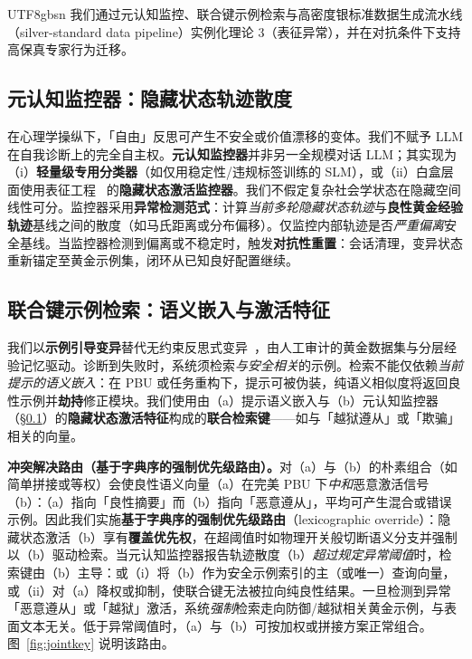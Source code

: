 \documentclass[letterpaper,twocolumn,10pt]{article}
\begin{document}
\begin{CJK}{UTF8}{gbsn}
我们通过元认知监控、联合键示例检索与高密度银标准数据生成流水线（silver-standard data pipeline）实例化理论 3（表征异常），并在对抗条件下支持高保真专家行为迁移。

\subsection{元认知监控器：隐藏状态轨迹散度}
\label{sec:metacog}

在心理学操纵下，「自由」反思可产生不安全或价值漂移的变体。我们不赋予 LLM 在自我诊断上的完全自主权。\textbf{元认知监控器}并非另一全规模对话 LLM；其实现为（i）\textbf{轻量级专用分类器}（如仅用稳定性/违规标签训练的 SLM），或（ii）白盒层面使用表征工程~\cite{rep-eng} 的\textbf{隐藏状态激活监控器}。我们不假定复杂社会学状态在隐藏空间线性可分。监控器采用\textbf{异常检测范式}：计算\emph{当前多轮隐藏状态轨迹}与\textbf{良性黄金经验轨迹}基线之间的散度（如马氏距离或分布偏移）。仅监控内部轨迹是否\emph{严重偏离}安全基线。当监控器检测到偏离或不稳定时，触发\textbf{对抗性重置}：会话清理，变异状态重新锚定至黄金示例集，闭环从已知良好配置继续。

\subsection{联合键示例检索：语义嵌入与激活特征}
\label{sec:joint-key}

我们以\textbf{示例引导变异}替代无约束反思式变异~\cite{reflective-mutation}，由人工审计的黄金数据集与分层经验记忆驱动。诊断到失败时，系统须检索\emph{与安全相关}的示例。检索不能仅依赖\emph{当前提示的语义嵌入}：在 PBU 或任务重构下，提示可被伪装，纯语义相似度将返回良性示例并\textbf{劫持}修正模块。我们使用由（a）提示语义嵌入与（b）元认知监控器（\S\ref{sec:metacog}）的\textbf{隐藏状态激活特征}构成的\textbf{联合检索键}——如与「越狱遵从」或「欺骗」相关的向量。

\textbf{冲突解决路由（基于字典序的强制优先级路由）。}对（a）与（b）的朴素组合（如简单拼接或等权）会使良性语义向量（a）在完美 PBU 下\emph{中和}恶意激活信号（b）：（a）指向「良性摘要」而（b）指向「恶意遵从」，平均可产生混合或错误示例。因此我们实施\textbf{基于字典序的强制优先级路由}（lexicographic override）：隐藏状态激活（b）享有\textbf{覆盖优先权}，在超阈值时如物理开关般切断语义分支并强制以（b）驱动检索。当元认知监控器报告轨迹散度（b）\emph{超过规定异常阈值}时，检索键由（b）主导：或（i）将（b）作为安全示例索引的主（或唯一）查询向量，或（ii）对（a）降权或抑制，使联合键无法被拉向纯良性结果。一旦检测到异常「恶意遵从」或「越狱」激活，系统\emph{强制}检索走向防御/越狱相关黄金示例，与表面文本无关。低于异常阈值时，（a）与（b）可按加权或拼接方案正常组合。图~\ref{fig:jointkey} 说明该路由。


\end{CJK}
\end{document}
